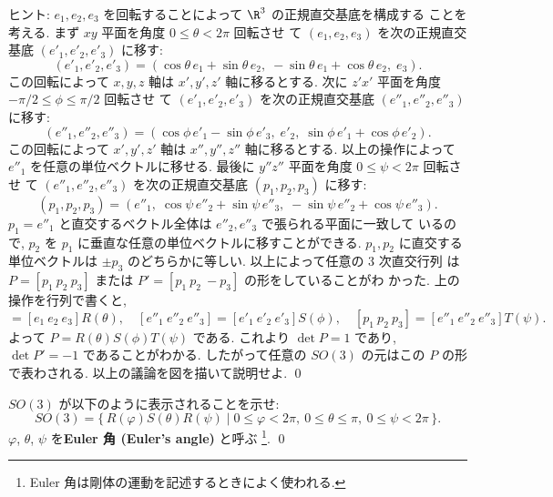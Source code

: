 \documentclass[12pt,twoside]{jarticle}
\begin{document}
\noindent
ヒント: $e_1,e_2,e_3$ を回転することによって $\R^3$ の正規直交基底を構成する
ことを考える.  まず $xy$ 平面を角度 $0\le\theta<2\pi$ 回転させ
て $(e_1,e_2,e_3)$ を次の正規直交基底 $(e'_1,e'_2,e'_3)$ に移す:
\begin{equation*}
  (e'_1,e'_2,e'_3) =
  (\cos\theta\,e_1+\sin\theta\,e_2,\;
  -\sin\theta\,e_1+\cos\theta\,e_2,\;
  e_3).
\end{equation*}
この回転によって $x,y,z$ 軸は $x',y',z'$ 軸に移るとする.  
次に $z'x'$ 平面を角度 $-\pi/2\le\phi\le\pi/2$ 回転させ
て $(e'_1,e'_2,e'_3)$ を次の正規直交基底 $(e''_1,e''_2,e''_3)$ に移す:
\begin{equation*}
  (e''_1,e''_2,e''_3) =
  (\cos\phi\,e'_1-\sin\phi\,e'_3,\;
  e'_2,\;
  \sin\phi\,e'_1+\cos\phi\,e'_2).
\end{equation*}
この回転によって $x',y',z'$ 軸は $x'',y'',z''$ 軸に移るとする.  
以上の操作によって $e''_1$ を任意の単位ベクトルに移せる.
最後に $y''z''$ 平面を角度 $0\le\psi<2\pi$ 回転させ
て $(e''_1,e''_2,e''_3)$ を次の正規直交基底 $(p_1,p_2,p_3)$ に移す:
\begin{equation*}
  (p_1,p_2,p_3) =
  (e''_1,\;
   \cos\psi\,e''_2+\sin\psi\,e''_3,\;
  -\sin\psi\,e''_2+\cos\psi\,e''_3).
\end{equation*}
$p_1=e''_1$ と直交するベクトル全体は $e''_2,e''_3$ で張られる平面に一致して
いるので, $p_2$ を $p_1$ に垂直な任意の単位ベクトルに移すことができる. 
$p_1,p_2$ に直交する単位ベクトルは $\pm p_3$ のどちらかに等しい.
以上によって任意の $3$ 次直交行列
は $P=[p_1\ p_2\ p_3]$ または $P'=[p_1\ p_2\ -p_3]$ の形をしていることがわ
かった.  上の操作を行列で書くと,
\begin{equation*}
  [e'_1\ e'_2\ e'_3] = [e_1\ e_2\ e_3] R(\theta), \quad
  [e''_1\ e''_2\ e''_3] = [e'_1\ e'_2\ e'_3] S(\phi), \quad
  [p_1\ p_2\ p_3] = [e''_1\ e''_2\ e''_3] T(\psi).
\end{equation*}
よって $P = R(\theta)S(\phi)T(\psi)$ である. 
これより $\det P=1$ であり, $\det P'=-1$ であることがわかる.
したがって任意の $SO(3)$ の元はこの $P$ の形で表わされる.
以上の議論を図を描いて説明せよ.
\qed


\begin{question}[Euler 角]
\label{q:Euler-angle}
  $SO(3)$ が以下のように表示されることを示せ:
  \begin{equation*}
    SO(3) = 
    \{\, R(\varphi)S(\theta)R(\psi) 
    \mid 0\le\varphi<2\pi,\ 0\le\theta\le\pi,\ 0\le\psi<2\pi \,\}.
  \end{equation*}
  $\varphi$, $\theta$, $\psi$ を{\bf Euler 角 (Euler's angle)} と呼ぶ%
  \footnote{Euler 角は剛体の運動を記述するときによく使われる.}.
  \qed
\end{question}
\end{document}
